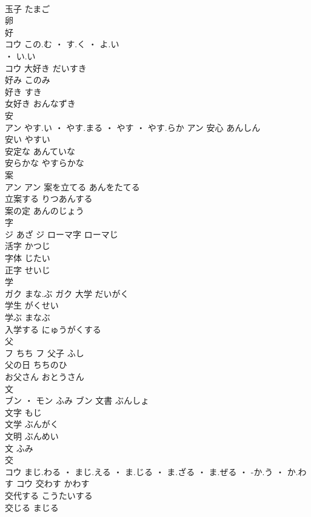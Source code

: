 \documentclass[8pt]{extreport}
\begin{document}
\begin{CJK}{UTF8}{min}
\\	玉子	たまご	
\\	卵 
\\	好	
\\	コウ	この.む ・ す.く ・ よ.い
\\	・ い.い
\\	コウ	大好き	だいすき	
\\	好み	このみ	
\\	好き	すき	
\\	女好き	おんなずき	
\\	安	
\\	アン	やす.い ・ やす.まる ・ やす ・ やす.らか	アン	安心	あんしん	
\\	安い	やすい	
\\	安定な	あんていな	
\\	安らかな	やすらかな	
\\	案	
\\	アン		アン	案を立てる	あんをたてる	
\\	立案する	りつあんする	
\\	案の定	あんのじょう	
\\	字	
\\	ジ	あざ	ジ	ローマ字	ローマじ	
\\	活字	かつじ	
\\	字体	じたい	
\\	正字	せいじ	
\\	学	
\\	ガク	まな.ぶ	ガク	大学	だいがく	
\\	学生	がくせい	
\\	学ぶ	まなぶ	
\\	入学する	にゅうがくする	
\\	父	
\\	フ	ちち	フ	父子	ふし	
\\	父の日	ちちのひ	
\\	お父さん	おとうさん	
\\	文	
\\	ブン ・ モン	ふみ	ブン	文書	ぶんしょ	
\\	文字	もじ	
\\	文学	ぶんがく	
\\	文明	ぶんめい	
\\	文	ふみ	
\\	交	
\\	コウ	まじ.わる ・ まじ.える ・ ま.じる ・ ま.ざる ・ ま.ぜる ・ -か.う ・ か.わす	コウ	交わす	かわす	
\\	交代する	こうたいする	
\\	交じる	まじる	

\end{CJK}
\end{document}
